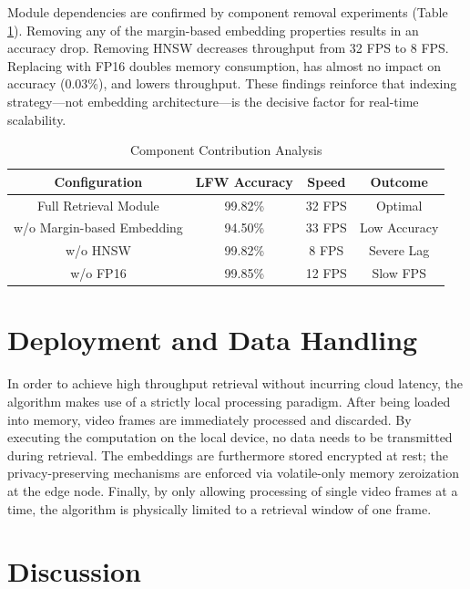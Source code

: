 \documentclass[conference]{IEEEtran}
\begin{document}
Module dependencies are confirmed by component removal experiments (Table \ref{tab_ablation}). Removing any of the margin-based embedding properties results in an accuracy drop. Removing HNSW decreases throughput from 32 FPS to 8 FPS. Replacing with FP16 doubles memory consumption, has almost no impact on accuracy (0.03\%), and lowers throughput. These findings reinforce that indexing strategy—not embedding architecture—is the decisive factor for real-time scalability.

\begin{table}[htbp]
\caption{Component Contribution Analysis}
\begin{center}
\begin{tabular}{|c|c|c|c|}
\hline
Configuration & LFW Accuracy & Speed & Outcome \\
\hline
Full Retrieval Module & 99.82\% & 32 FPS & Optimal \\
\hline
w/o Margin-based Embedding & 94.50\% & 33 FPS & Low Accuracy \\
\hline
w/o HNSW & 99.82\% & 8 FPS & Severe Lag \\
\hline
w/o FP16 & 99.85\% & 12 FPS & Slow FPS \\
\hline
\end{tabular}
\label{tab_ablation}
\end{center}
\end{table}

\section{Deployment and Data Handling}
In order to achieve high throughput retrieval without incurring cloud latency, the algorithm makes use of a strictly local processing paradigm. After being loaded into memory, video frames are immediately processed and discarded. By executing the computation on the local device, no data needs to be transmitted during retrieval. The embeddings are furthermore stored encrypted at rest; the privacy-preserving mechanisms are enforced via volatile-only memory zeroization at the edge node. Finally, by only allowing processing of single video frames at a time, the algorithm is physically limited to a retrieval window of one frame.

\section{Discussion}
\end{document}
